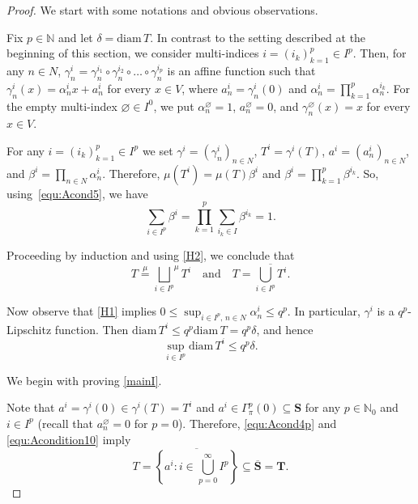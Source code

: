 \documentclass{amsart}
\theoremstyle{plain}%
\theoremstyle{definition}
\theoremstyle{remark}
\newcommand{\meq}{\mathop{=}\limits^{\mu}}
\begin{document}
\begin{proof}
We start with some notations and obvious observations. 

Fix $p\in\mathbb{N}$ and let $\delta=\text{diam}\,T$. In contrast to the setting described at the beginning of this section, we consider multi-indices $i=(i_k)_{k=1}^p\in I^p$. Then, for any $n\in N$, ${\gamma^i_n=\gamma^{i_1}_n\circ\gamma^{i_2}_n\circ\dots\circ\gamma^{i_p}_n}$ is an affine function such that $\gamma^i_n(x)=\alpha^i_nx+a^i_n$ for every $x\in V$, where $a^i_n=\gamma^i_n(0)$ and $\alpha^i_n=\prod_{k=1}^p\alpha^{i_k}_n$. 
For the empty multi-index $\varnothing\in I^0$, we put $\alpha^\varnothing_n=1$, $a^\varnothing_n=0$, and $\gamma^\varnothing_n(x)=x$ for every $x\in V$. 

For any $i=(i_k)_{k=1}^p\in I^p$ we set $\gamma^i=(\gamma^i_n)_{n\in N}$, $T^i=\gamma^i(T)$, $a^i=(a^i_n)_{n\in N}$, and $\beta^i=\prod_{n\in N}\alpha^i_n$. Therefore, $\mu(T^i)=\mu(T)\beta^i$ and $\beta^i=\prod_{k=1}^p\beta^{i_k}$. So, using~\eqref{equ:Acond5}, we have
\begin{equation}\label{equ:Acondition8}
\sum_{i\in I^p}\beta^i=\prod_{k=1}^p\sum_{i_k\in I}\beta^{i_k}=1.
\end{equation}

Proceeding by induction and using \ref{H2}, we conclude that
\begin{equation}\label{equ:Acond4p}
T\meq{\bigsqcup_{i\in I^p}}^\mu T^i\quad\text{and}\quad 
T=\overline{\bigcup_{i\in I^p}T^i}.
\end{equation}

Now observe that \ref{H1} implies $0\leq\sup_{i\in I^p,\,n\in N}\alpha^i_n\le q^p$.
In particular, $\gamma^i$ is a $q^p$\nobreakdash-Lipschitz function. Then $\mathrm{diam}\,T^i\le q^p\mathrm{diam}\,T=q^p\delta$, and hence
\begin{equation}\label{equ:Acondition10}
\sup_{i\in I^p}\mathrm{diam}\,T^i \le q^p\delta.
\end{equation}

We begin with proving \cref{mainI}.

Note that $a^i=\gamma^i(0)\in\gamma^i(T)=T^i$ and $a^i\in \Gamma^p_\pi(0)\subseteq \mathbf{S}$ for any $p\in\mathbb{N}_0$ and $i\in I^p$ (recall that $a^{\varnothing}_n=0$ for $p=0$). Therefore, \eqref{equ:Acond4p} and \eqref{equ:Acondition10} imply
\begin{equation*}\label{equ:Acondition11}
\textstyle T=\overline{\left\{a^i:i\in \bigcup_{p=0}^{\infty}I^p\right\}}
\subseteq\overline{\mathbf{S}}=\mathbf{T}.
\end{equation*}
	

\end{proof}
\end{document}

